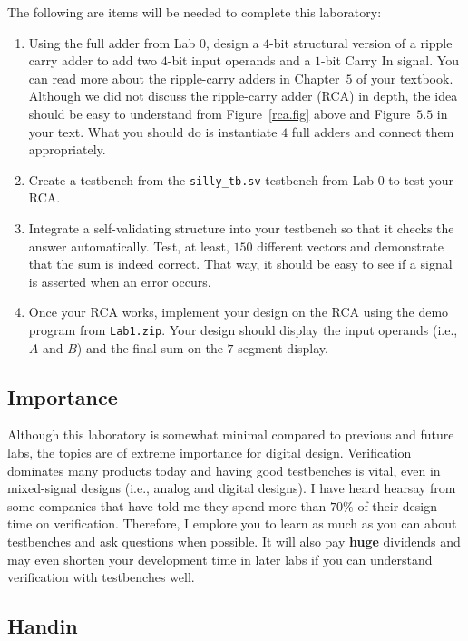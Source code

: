 \documentclass{article}
\begin{document}
The following are items will be needed to complete this laboratory:
\begin{enumerate}
  \item Using the full adder from Lab 0, design a $4$-bit structural
    version of a ripple carry
    adder to add two $4$-bit input operands and a $1$-bit Carry In
    signal.  You can read more about the ripple-carry adders in
    Chapter~$5$ of your textbook.  Although we did not discuss the
    ripple-carry adder (RCA) in depth,
    the idea should be easy to understand from
    Figure~\ref{rca.fig} above and Figure~$5.5$ in your text.  What
    you should do is instantiate $4$ full adders and connect them
    appropriately.  
    \item Create a testbench from the \verb!silly_tb.sv! testbench from
      Lab 0 to test your RCA.  
    \item Integrate a self-validating structure into your testbench so
      that it checks the answer automatically.  Test, at least, $150$
      different vectors and demonstrate that the sum is indeed
      correct.  That way, it
      should be easy to see if a signal is asserted when an error occurs.
    \item Once your RCA works, implement your design on the RCA
      using the demo program from \verb!Lab1.zip!.  Your design should
      display the input operands (i.e., $A$ and $B$) and the final
      sum on the $7$-segment display.
\end{enumerate}

\subsection{Importance}

Although this laboratory is somewhat minimal compared to previous and
future labs, the topics are of extreme importance for digital design.
Verification dominates many products today and having good testbenches
is vital, even in mixed-signal designs (i.e., analog and digital
designs).  I have heard hearsay from some companies that have told me
they spend more than  $70\%$ of their design time on verification.
Therefore, I emplore you to learn as much as you can about
testbenches and ask questions when possible.  It will also pay
\textbf{huge} dividends and may even shorten your development time
in later labs if you can understand
verification with testbenches well.

\subsection{Handin}
\end{document}

